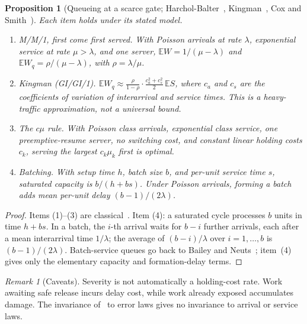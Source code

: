 \documentclass[11pt]{article}
\newtheorem{proposition}[theorem]{Proposition}
\theoremstyle{definition}
\theoremstyle{remark}
\newtheorem{remark}[theorem]{Remark}
\newcommand{\E}{\mathbb E}
\begin{document}
\begin{proposition}[Queueing at a scarce gate; Harchol-Balter~\cite{harchol}, Kingman~\cite{kingman61,kingman62},
Cox and Smith~\cite{coxsmith}]\label{prop:queue}
Each item holds under its stated model.
\begin{enumerate}[label=(\arabic*),itemsep=2pt]
\item \emph{M/M/1, first come first served.} With Poisson arrivals at rate $\lambda$, exponential
service at rate $\mu>\lambda$, and one server, $\E W=1/(\mu-\lambda)$ and $\E W_q=\rho/(\mu-\lambda)$,
with $\rho=\lambda/\mu$.
\item \emph{Kingman (GI/GI/1).} $\E W_q\approx\frac{\rho}{1-\rho}\cdot\frac{c_a^2+c_s^2}{2}\,\E S$, where
$c_a$ and $c_s$ are the coefficients of variation of interarrival and service times. This is a
heavy-traffic approximation, not a universal bound.
\item \emph{The $c\mu$ rule.} With Poisson class arrivals, exponential class service, one
preemptive-resume server, no switching cost, and constant linear holding costs $c_k$, serving the
largest $c_k\mu_k$ first is optimal.
\item \emph{Batching.} With setup time $h$, batch size $b$, and per-unit service time $s$, saturated
capacity is $b/(h+bs)$. Under Poisson arrivals, forming a batch adds mean per-unit delay
$(b-1)/(2\lambda)$.
\end{enumerate}
\end{proposition}
\begin{proof}
Items (1)--(3) are classical~\cite{harchol,kingman61,kingman62,coxsmith,buyukkoc85}. Item (4): a saturated cycle
processes $b$ units in time $h+bs$. In a batch, the $i$-th arrival waits for $b-i$ further arrivals,
each after a mean interarrival time $1/\lambda$; the average of $(b-i)/\lambda$ over $i=1,\dots,b$ is
$(b-1)/(2\lambda)$. Batch-service queues go back to Bailey and Neuts~\cite{bailey54,neuts67}; item~(4)
gives only the elementary capacity and formation-delay terms.
\end{proof}
\begin{remark}[Caveats]
Severity is not automatically a holding-cost rate. Work awaiting safe release incurs delay cost, while
work already exposed accumulates damage. The invariance of~\cite{p6} to error laws gives no invariance
to arrival or service laws.
\end{remark}
\end{document}
